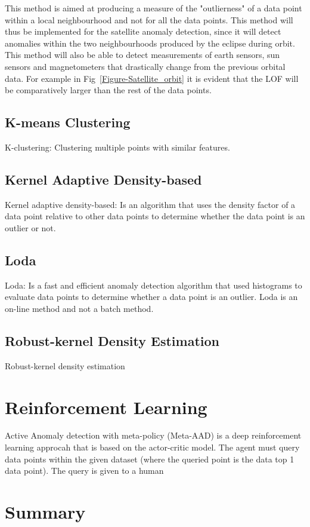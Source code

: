 This method is aimed at producing a measure of the "outlierness" of a data point within a local neighbourhood and not for all the data points. This method will thus be implemented for the satellite anomaly detection, since it will detect anomalies within the two neighbourhoods produced by the eclipse during orbit. This method will also be able to detect measurements of earth sensors, sun sensors and magnetometers that drastically change from the previous orbital data. For example in Fig~\ref{Figure-Satellite_orbit} it is evident that the LOF will be comparatively larger than the rest of the data points. 

\subsection{K-means Clustering}
K-clustering: Clustering multiple points with similar features.

\subsection{Kernel Adaptive Density-based}
Kernel adaptive density-based: Is an algorithm that uses the density factor of a data point relative to other data points to determine whether the data point is an outlier or not.

\subsection{Loda}
Loda: Is a fast and efficient anomaly detection algorithm that used histograms to evaluate data points to determine whether a data point is an outlier. Loda is an on-line method and not a batch method.

\subsection{Robust-kernel Density Estimation}
Robust-kernel density estimation

\section{Reinforcement Learning}
Active Anomaly detection with meta-policy (Meta-AAD) is a deep reinforcement learning approcah that is based on the actor-critic model. The agent must query data points within the given dataset (where the queried point is the data top 1 data point). The query is given to a human 


\section{Summary}


